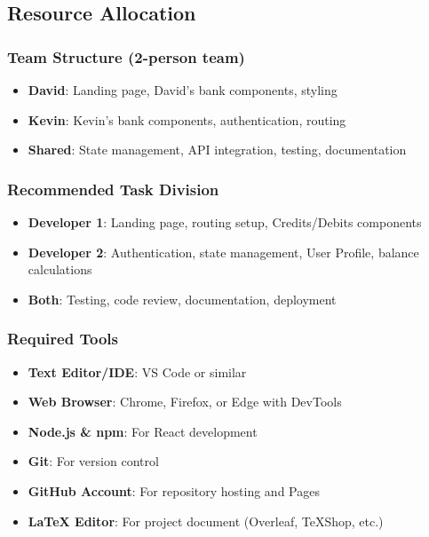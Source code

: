 \documentclass[11pt,a4paper]{article}
\begin{document}
\subsection{Resource Allocation}

\subsubsection{Team Structure (2-person team)}
\begin{itemize}[leftmargin=*]
    \item \textbf{David}: Landing page, David's bank components, styling
    \item \textbf{Kevin}: Kevin's bank components, authentication, routing
    \item \textbf{Shared}: State management, API integration, testing, documentation
\end{itemize}

\subsubsection{Recommended Task Division}
\begin{itemize}[leftmargin=*]
    \item \textbf{Developer 1}: Landing page, routing setup, Credits/Debits components
    \item \textbf{Developer 2}: Authentication, state management, User Profile, balance calculations
    \item \textbf{Both}: Testing, code review, documentation, deployment
\end{itemize}

\subsubsection{Required Tools}
\begin{itemize}[leftmargin=*]
    \item \textbf{Text Editor/IDE}: VS Code or similar
    \item \textbf{Web Browser}: Chrome, Firefox, or Edge with DevTools
    \item \textbf{Node.js \& npm}: For React development
    \item \textbf{Git}: For version control
    \item \textbf{GitHub Account}: For repository hosting and Pages
    \item \textbf{LaTeX Editor}: For project document (Overleaf, TeXShop, etc.)
\end{itemize}
\end{document}
